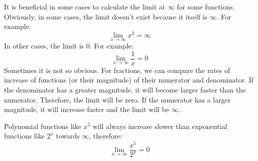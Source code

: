 \documentclass[../revisedMain.tex]{subfiles}
\begin{document}
	    It is beneficial in some cases to calculate the limit at $\infty$ for some functions. Obviously, in some cases, the limit doesn't exist because it itself is $\infty$. For example: $$\lim_{x\to\infty} x^2 = \infty$$ In other cases, the limit is 0. For example: $$\lim_{x\to\infty} \frac{1}{x}=0$$
	    Sometimes it is not so obvious. For fractions, we can compare the rates of increase of functions (or their magnitude) of their numerator and denominator. If the denominator has a greater magnitude, it will become larger faster than the numerator. Therefore, the limit will be zero. If the numerator has a larger magnitude, it will increase faster and the limit will be $\infty$. 
	    \begin{center}
	    \newline
	    Polynomial functions like $x^5$ will always increase slower than exponential functions like $2^x$ towards $\infty$, therefore: \[\lim_{x\to\infty}\frac{x^5}{2^x}=0\]
	\end{center}
\end{document}
